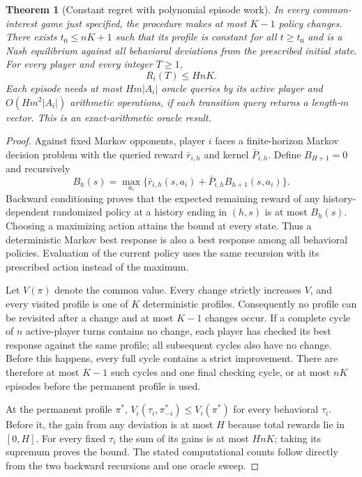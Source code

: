 \documentclass[11pt,a4paper]{article}
\newtheorem{theorem}{Theorem}[section]
\theoremstyle{definition}
\theoremstyle{remark}
\begin{document}
\begin{theorem}[Constant regret with polynomial episode work]
In every common-interest game just specified, the procedure makes at most $K-1$ policy changes. There exists $t_0\le nK+1$ such that its profile is constant for all $t\ge t_0$ and is a Nash equilibrium against all behavioral deviations from the prescribed initial state. For every player and every integer $T\ge1$,
\[
 R_i(T)\le HnK.
\]
Each episode needs at most $Hm|A_i|$ oracle queries by its active player and $O(Hm^2|A_i|)$ arithmetic operations, if each transition query returns a length-$m$ vector. This is an exact-arithmetic oracle result.
\end{theorem}
\begin{proof}
Against fixed Markov opponents, player $i$ faces a finite-horizon Markov decision problem with the queried reward $\bar r_{i,h}$ and kernel $\bar P_{i,h}$. Define $B_{H+1}=0$ and recursively
\[
 B_h(s)=\max_{a_i}\{\bar r_{i,h}(s,a_i)
              +\bar P_{i,h}B_{h+1}(s,a_i)\}.
\]
Backward conditioning proves that the expected remaining reward of any history-dependent randomized policy at a history ending in $(h,s)$ is at most $B_h(s)$. Choosing a maximizing action attains the bound at every state. Thus a deterministic Markov best response is also a best response among all behavioral policies. Evaluation of the current policy uses the same recursion with its prescribed action instead of the maximum.

Let $V(\pi)$ denote the common value. Every change strictly increases $V$, and every visited profile is one of $K$ deterministic profiles. Consequently no profile can be revisited after a change and at most $K-1$ changes occur. If a complete cycle of $n$ active-player turns contains no change, each player has checked its best response against the same profile; all subsequent cycles also have no change. Before this happens, every full cycle contains a strict improvement. There are therefore at most $K-1$ such cycles and one final checking cycle, or at most $nK$ episodes before the permanent profile is used.

At the permanent profile $\pi^*$, $V_i(\tau_i,\pi_{-i}^*)\le V_i(\pi^*)$ for every behavioral $\tau_i$. Before it, the gain from any deviation is at most $H$ because total rewards lie in $[0,H]$. For every fixed $\tau_i$ the sum of its gains is at most $HnK$; taking its supremum proves the bound. The stated computational counts follow directly from the two backward recursions and one oracle sweep.
\end{proof}
\end{document}
